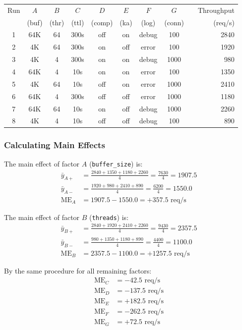 \documentclass[11pt]{book}
\begin{document}
\begin{center}
\begin{tabular}{cccccccccr}
\toprule
Run & $A$ & $B$ & $C$ & $D$ & $E$ & $F$ & $G$ & & Throughput \\
    & (buf) & (thr) & (ttl) & (comp) & (ka) & (log) & (conn) & & (req/s) \\
\midrule
1 & 64K & 64 & 300s & off & on & debug & 100  & & 2840 \\
2 & 4K  & 64 & 300s & on  & off & error & 100 & & 1920 \\
3 & 4K  & 4  & 300s & on  & on  & debug & 1000 & & 980 \\
4 & 64K & 4  & 10s  & on  & on  & error & 100  & & 1350 \\
5 & 4K  & 64 & 10s  & off & on  & error & 1000 & & 2410 \\
6 & 64K & 4  & 300s & off & off & error & 1000 & & 1180 \\
7 & 64K & 64 & 10s  & on  & off & debug & 1000 & & 2260 \\
8 & 4K  & 4  & 10s  & off & off & debug & 100  & & 890 \\
\bottomrule
\end{tabular}
\end{center}

\subsubsection{Calculating Main Effects}

The main effect of factor $A$ (\texttt{buffer\_size}) is:
\begin{align*}
\bar{y}_{A+} &= \frac{2840 + 1350 + 1180 + 2260}{4} = \frac{7630}{4} = 1907.5 \\
\bar{y}_{A-} &= \frac{1920 + 980 + 2410 + 890}{4} = \frac{6200}{4} = 1550.0 \\
\text{ME}_A &= 1907.5 - 1550.0 = +357.5 \text{ req/s}
\end{align*}

The main effect of factor $B$ (\texttt{threads}) is:
\begin{align*}
\bar{y}_{B+} &= \frac{2840 + 1920 + 2410 + 2260}{4} = \frac{9430}{4} = 2357.5 \\
\bar{y}_{B-} &= \frac{980 + 1350 + 1180 + 890}{4} = \frac{4400}{4} = 1100.0 \\
\text{ME}_B &= 2357.5 - 1100.0 = +1257.5 \text{ req/s}
\end{align*}

By the same procedure for all remaining factors:
\begin{align*}
\text{ME}_C &= -42.5 \text{ req/s} \\
\text{ME}_D &= -137.5 \text{ req/s} \\
\text{ME}_E &= +182.5 \text{ req/s} \\
\text{ME}_F &= -262.5 \text{ req/s} \\
\text{ME}_G &= +72.5 \text{ req/s}
\end{align*}
\end{document}
